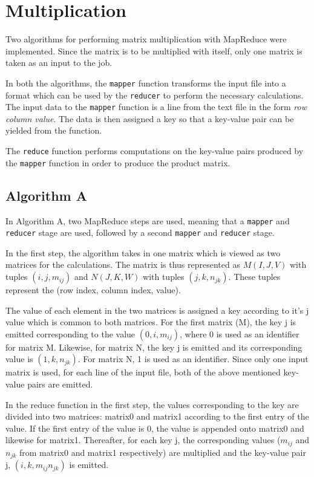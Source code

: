 \documentclass[10pt,twocolumn]{witseiepaper}
\begin{document}
\section{Multiplication}
Two algorithms for performing matrix multiplication with MapReduce were implemented. Since the matrix is to be multiplied with itself, only one matrix is taken as an input to the job.

In both the algorithms, the \texttt{mapper} function transforms the input file into a format which can be used by the \texttt{reducer} to perform the necessary calculations. The input data to the \texttt{mapper} function is a line from the text file in the form \textit{row column value}. The data is then assigned a key so that a key-value pair can be yielded from the function.

The \texttt{reduce} function performs computations on the key-value pairs produced by the \texttt{mapper} function in order to produce the product matrix.

\subsection{Algorithm A} \label{algA}
In Algorithm A, two MapReduce steps are used, meaning that a \texttt{mapper} and \texttt{reducer} stage are used, followed by a second \texttt{mapper} and \texttt{reducer} stage.

In the first step, the algorithm takes in one matrix which is viewed as two matrices for the calculations. The matrix is thus represented as $M(I, J, V)$ with tuples $(i, j, m_{ij})$ and $N(J, K, W)$ with tuples $(j, k, n_{jk})$. These tuples represent the (row index, column index, value).

The value of each element in the two matrices is assigned a key according to it's j value which is common to both matrices. For the first matrix (M), the key j is emitted corresponding to the value $(0, i, m_{ij})$, where 0 is used as an identifier for matrix M. Likewise, for matrix N, the key j is emitted and its corresponding value is $(1, k, n_{jk})$. For matrix N, 1 is used as an identifier. Since only one input matrix is used, for each line of the input file, both of the above mentioned key-value pairs are emitted.

In the reduce function in the first step, the values corresponding to the key are divided into two matrices: matrix0 and matrix1 according to the first entry of the value. If the first entry of the value is 0, the value is appended onto matrix0 and likewise for matrix1. Thereafter, for each key j, the corresponding values ($m_{ij}$ and $n_{jk}$ from matrix0 and matrix1 respectively) are multiplied and the key-value pair j, $(i, k, m_{ij}n_{jk})$ is emitted.
\end{document}
